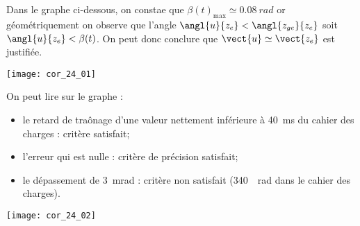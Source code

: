 \question{}
\ifprof
\begin{corrige}
Dans le graphe ci-dessous, on constae que $\beta(t)_{\text{max}} \simeq \SI{0,08}{rad}$ or géométriquement on observe que l'angle $\angl{{u}}{{z_e}} <\angl{{z_{ge}}}{{z_e}}$
soit $\angl{{u}}{{z_e}}<\beta(t)$. On peut donc conclure que $\vect{u}\simeq \vect{z_e}$ est justifiée.

\begin{center}
\texttt{[image: cor\_24\_01]}
\end{center}
On peut lire sur le graphe : 
\begin{itemize}
\item le retard de traônage d'une valeur nettement inférieure à \SI{40}{ms} du cahier des charges : critère satisfait;
\item l'erreur qui est nulle : critère de précision satisfait;
\item le dépassement de \SI{3}{mrad} : critère non satisfait (\SI{340}{\mu rad} dans le cahier des charges). 
\end{itemize}
\begin{center}
\texttt{[image: cor\_24\_02]}
\end{center}

\end{corrige}
\else
\fi

%
%
